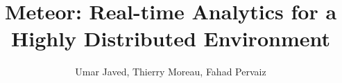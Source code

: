 \documentclass{article}
\begin{document}
\title{Meteor: Real-time Analytics for a Highly Distributed Environment}
\author{Umar Javed, Thierry Moreau, Fahad Pervaiz}

\maketitle









\end{document}
